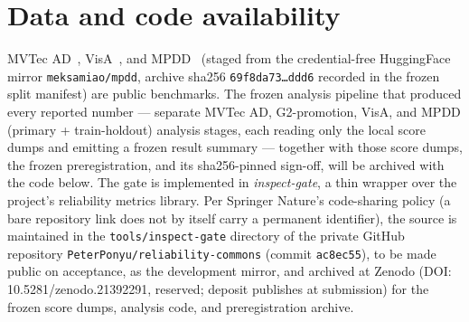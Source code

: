 \documentclass[11pt]{article}
\begin{document}
\section*{Data and code availability}
MVTec AD~\citep{bergmann2019mvtec}, VisA~\citep{zou2022spot}, and
MPDD~\citep{jezek2021mpdd} (staged from the credential-free HuggingFace mirror
\texttt{meksamiao/mpdd}, archive sha256 \texttt{69f8da73\ldots ddd6} recorded in the frozen split
manifest) are public benchmarks. The frozen analysis pipeline that produced every reported number
--- separate MVTec AD, G2-promotion, VisA, and MPDD (primary + train-holdout) analysis stages, each
reading only the local score dumps and emitting a frozen result summary --- together with those
score dumps, the frozen preregistration, and its sha256-pinned sign-off, will be archived with the
code below. The gate is implemented in \emph{inspect-gate}, a thin wrapper over the project's
reliability metrics library. Per Springer Nature's code-sharing policy (a bare repository link does
not by itself carry a permanent identifier), the source is maintained in the
\texttt{tools/inspect-gate} directory of the private GitHub repository
\texttt{PeterPonyu/reliability-commons} (commit \texttt{ac8ec55}), to be made public on
acceptance, as the development mirror, and archived at Zenodo (DOI: 10.5281/zenodo.21392291,
reserved; deposit publishes at submission) for the frozen score dumps, analysis code, and
preregistration archive.



\end{document}
